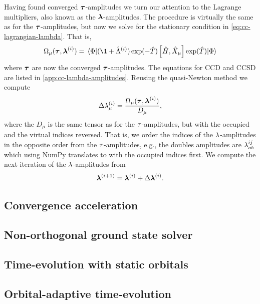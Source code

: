             Having found converged $\boldsymbol{\tau}$-amplitudes we turn our
            attention to the Lagrange multipliers, also known as the
            $\boldsymbol{\lambda}$-amplitudes.
            The procedure is virtually the same as for the
            $\boldsymbol{\tau}$-amplitudes, but now we solve for the stationary
            condition in \autoref{eq:cc-lagrangian-lambda}.
            That is,
            \begin{align}
                \Omega_{\mu}(\vfg{\clustamp}, \vfg{\clustlamp}^{(i)})
                = \mel{\slat}{
                    (\1 + \clustl^{(i)})
                    \exponential(-\clust)
                    \com{\hamil}{\hat{X}_{\mu}}
                    \exponential(\clust)
                }{\slat}
            \end{align}
            where $\boldsymbol{\tau}$ are now the converged
            $\boldsymbol{\tau}$-amplitudes.
            The equations for CCD and CCSD are listed in
            \autoref{app:cc-lambda-amplitudes}.
            Reusing the quasi-Newton method we compute
            \begin{align}
                \Delta\lambda_{\mu}^{(i)}
                = \frac{
                    \Omega_{\mu}(\boldsymbol{\tau}, \boldsymbol{\lambda}^{(i)})
                }{
                    D_{\mu}
                },
            \end{align}
            where the $D_{\mu}$ is the same tensor as for the
            $\tau$-amplitudes, but with the occupied and the virtual
            indices reversed.
            That is, we order the indices of the $\lambda$-amplitudes
            in the opposite order from the $\tau$-amplitudes, e.g., the
            doubles amplitudes are $\lambda^{ij}_{ab}$ which using NumPy
            translates to  with the occupied indices
            first.
            We compute the next iteration of the $\lambda$-amplitudes from
            \begin{align}
                \boldsymbol{\lambda}^{(i + 1)}
                = \boldsymbol{\lambda}^{(i)}
                + \Delta\boldsymbol{\lambda}^{(i)}.
            \end{align}


        \subsection{Convergence acceleration}

        \subsection{Non-orthogonal ground state solver}

        \subsection{Time-evolution with static orbitals}
        \subsection{Orbital-adaptive time-evolution}
